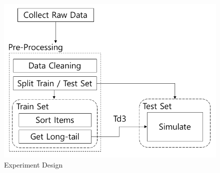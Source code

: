 \documentclass[sigconf,anonymous=true]{acmart}
\begin{document}
\begin{figure}[H]
    \centering
    \includegraphics[width=0.85\columnwidth]{figs/figure_design.png}
    \caption{Experiment Design}
    \label{fig:fig2}
\end{figure}
\end{document}

